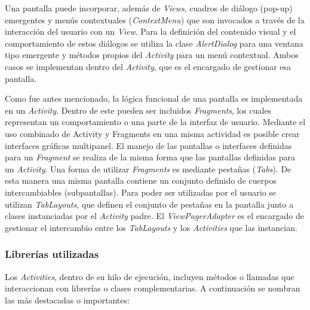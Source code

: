     \par Una pantalla puede incorporar, además de \textit{Views}, cuadros de diálogo (pop-up) emergentes y menús contextuales (\textit{ContextMenu}) que son invocados a través de la interacción del usuario con un \textit{View}. Para la definición del contenido visual y el comportamiento de estos diálogos se utiliza la clase \textit{AlertDialog} para una ventana tipo emergente y métodos propios del \textit{Activity} para un menú contextual. Ambos casos se implementan dentro del \textit{Activity}, que es el encargado de gestionar esa pantalla.
        
    \par Como fue antes mencionado, la lógica funcional de una pantalla es implementada en un \textit{Activity}. Dentro de este pueden ser incluidos \textit{Fragments}, los cuales representan un comportamiento o una parte de la interfaz de usuario. Mediante el uso combinado de Activity y Fragments en una misma actividad es posible crear interfaces gráficas multipanel. El manejo de las pantallas o interfaces definidas para un \textit{Fragment} se realiza de la misma forma que las pantallas definidas para un \textit{Activity}. Una forma de utilizar \textit{Fragments} es mediante pestañas (\textit{Tabs}). De esta manera una misma pantalla contiene un conjunto definido de cuerpos intercambiables (subpantallas). Para poder ser utilizadas por el usuario se utilizan \textit{TabLayouts}, que definen el conjunto de pestañas en la pantalla junto a clases instanciadas por el \textit{Activity} padre. El \textit{ViewPagerAdapter} es el encargado de gestionar el intercambio entre los \textit{TabLayouts} y los \textit{Activities} que las instancian.
    
    \subsubsection{Librerías utilizadas}
     \par Los \textit{Activities}, dentro de su hilo de ejecución, incluyen métodos o llamadas que interaccionan con librerías o clases complementarias. A continuación se nombran las más destacadas o importantes: 
     
